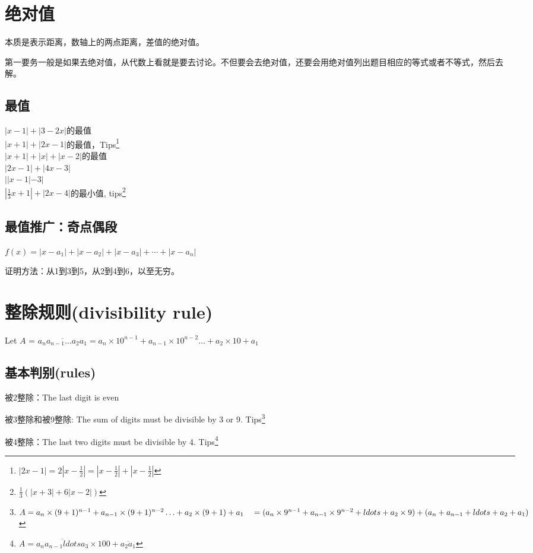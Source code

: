 \documentclass[../main.tex]{subfiles}
\begin{document}
\newpage
\section{绝对值}

本质是表示距离，数轴上的两点距离，差值的绝对值。

第一要务一般是如果去绝对值，从代数上看就是要去讨论。不但要会去绝对值，还要会用绝对值列出题目相应的等式或者不等式，然后去解。

\subsection{最值}
$|x-1|+ |3-2x|$的最值\\
$|x+1| + |2x-1|$的最值，Tips\footnote{$|2x-1| = 2|x-\frac{1}{2}|=|x-\frac{1}{2}|+|x-\frac{1}{2}|$}\\
$|x+1| + |x| + |x-2|$的最值\\
$|2x-1|+|4x-3|$\\
$||x-1|-3|$\\
$|\frac{1}{3}x+1|+|2x-4|$的最小值, tips\footnote{$\frac{1}{3}(|x+3|+6|x-2|)$}

\subsection{最值推广：奇点偶段}
$f(x) = |x-a_1| + |x-a_2|+ |x-a_3| + \cdots + |x-a_{n}| $

证明方法：从1到3到5，从2到4到6，以至无穷。

\newpage
\section{整除规则(divisibility rule)}
Let $A$ = $\overline{a_{n}a_{n-1}\ldots a_2a_1} = a_{n}\times 10^{n-1}+a_{n-1}\times 10^{n-2}\ldots +a_2\times 10 + a_1$
\subsection{基本判别(rules)}

被2整除：The last digit is even

被3整除和被9整除: The sum of digits must be divisible by $3$ or $9$.
Tips\footnote{$A = a_{n}\times (9+1)^{n-1}+a_{n-1}\times (9+1)^{n-2}\ldots +a_2\times (9+1)+a_1 \\
~~~   = (a_{n}\times 9^{n-1} + a_{n-1}\times 9^{n-2}+ldots +a_2\times 9)+(a_{n}+a_{n-1}+ldots +a_2+a_1) $}

被4整除：The last two digits must be divisible by 4. Tips\footnote{$A=\overline{a_{n}a_{n-1}ldots a_3} \times 100 + \overline{a_2 a_1}$}
\end{document}
